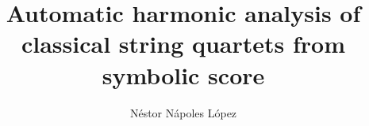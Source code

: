 \documentclass[a4paper,12pt,twoside]{report}
\begin{document}

\title{Automatic harmonic analysis of classical string quartets from symbolic score}
\author{N\'estor N\'apoles L\'opez}

\maketitle

\maketitle
\restoregeometry

\preface
\cleardoublepage




\body

\normallinespacing











\listoffigures
\newpage
\listoftables





\end{document}
